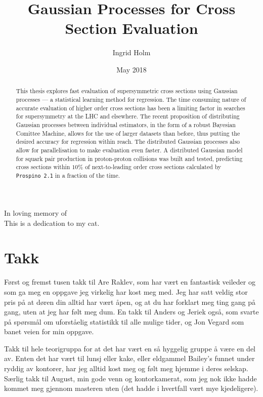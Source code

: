 \documentclass[twoside,english]{uiofysmaster}
\begin{document}
\title{Gaussian Processes for Cross Section Evaluation}
\author{Ingrid Holm}
\date{May 2018}

\maketitle

\begin{abstract}
This thesis explores fast evaluation of %
supersymmetric cross sections using Gaussian processes --- a statistical learning method for regression.  
The time consuming nature of accurate evaluation of higher order cross sections has been a limiting factor in searches for supersymmetry at the LHC and elsewhere.
The recent proposition of distributing Gaussian processes between individual estimators, in the form of a robust Bayesian Comittee Machine, allows for the use of larger datasets than before, thus putting the desired accuracy for regression within reach. The distributed Gaussian processes also allow for parallelisation to make evaluation even  faster. A distributed Gaussian model for squark pair production in proton-proton collisions was built and tested, predicting cross sections within $10 \%$ of next-to-leading order cross sections calculated by \verb|Prospino 2.1| in a fraction of the time.
\end{abstract}

\begin{dedication}
  In loving memory of
  \\\vspace{12pt}
  This is a dedication to my cat.
\end{dedication}


\chapter*{\centering Takk}
F{\o}rst og fremst tusen takk til Are Raklev, som har v{\ae}rt en fantastisk veileder og som ga meg en oppgave jeg virkelig har kost meg med. Jeg har satt veldig stor pris p{\aa} at d{\o}ren din alltid har vært {\aa}pen, og at du har forklart meg ting gang på gang, uten at jeg har følt meg dum. En takk til Anders og Jeriek ogs{\aa}, som svarte p{\aa} sp{\o}rsm{\aa}l om uforst{\aa}elig statistikk til alle mulige tider, og Jon Vegard som banet veien for min oppgave. 

Takk til hele teorigruppa for at det har v{\ae}rt en s{\aa} hyggelig gruppe {\aa} v{\ae}re en del av. Enten det har vært til lunsj eller kake, eller eldgammel Bailey's funnet under ryddig av kontorer, har jeg alltid kost meg og følt meg hjemme i deres selskap. S{\ae}rlig takk til August, min gode venn og kontorkamerat, som jeg nok ikke hadde kommet meg gjennom masteren uten (det hadde i hvertfall v{\ae}rt mye kjedeligere).
\end{document}
